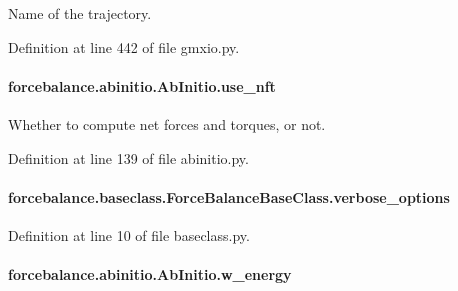 Name of the trajectory. 



Definition at line 442 of file gmxio.\-py.

\hypertarget{classforcebalance_1_1abinitio_1_1AbInitio_afd8d179560a295ffa6c6309843c59279}{
\paragraph[{use\-\_\-nft}]{\setlength{\rightskip}{0pt plus 5cm}forcebalance.\-abinitio.\-Ab\-Initio.\-use\-\_\-nft\hspace{0.3cm}{\ttfamily [inherited]}}}\label{classforcebalance_1_1abinitio_1_1AbInitio_afd8d179560a295ffa6c6309843c59279}


Whether to compute net forces and torques, or not. 



Definition at line 139 of file abinitio.\-py.

\hypertarget{classforcebalance_1_1baseclass_1_1ForceBalanceBaseClass_a8088e1e20cbd6bc175fb9c9fe9fa0f18}{
\paragraph[{verbose\-\_\-options}]{\setlength{\rightskip}{0pt plus 5cm}forcebalance.\-baseclass.\-Force\-Balance\-Base\-Class.\-verbose\-\_\-options\hspace{0.3cm}{\ttfamily [inherited]}}}\label{classforcebalance_1_1baseclass_1_1ForceBalanceBaseClass_a8088e1e20cbd6bc175fb9c9fe9fa0f18}


Definition at line 10 of file baseclass.\-py.

\hypertarget{classforcebalance_1_1abinitio_1_1AbInitio_aa7f09e2ffc1253844c9f0736caf9b9e5}{
\paragraph[{w\-\_\-energy}]{\setlength{\rightskip}{0pt plus 5cm}forcebalance.\-abinitio.\-Ab\-Initio.\-w\-\_\-energy\hspace{0.3cm}{\ttfamily [inherited]}}}\label{classforcebalance_1_1abinitio_1_1AbInitio_aa7f09e2ffc1253844c9f0736caf9b9e5}


